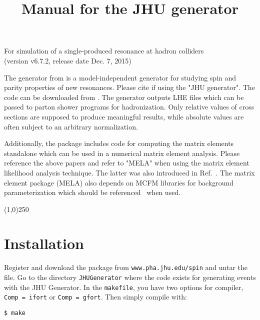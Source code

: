 \documentclass[aps,superscriptaddress,nofootinbib]{revtex4}
\begin{document}
\vspace{0.6cm}

\title{
\large
Manual for the JHU generator
}
\maketitle
\begin{center}
\small
For simulation of a single-produced resonance at hadron colliders \\
(version v6.7.2, release date Dec. 7, 2015) \\
\normalsize
\end{center}

\noindent
The generator from \cite{Gao:2010qx,Bolognesi:2012,Anderson:2013} is a model-independent generator for studying spin and parity properties of new resonances.
Please cite \cite{Gao:2010qx,Bolognesi:2012,Anderson:2013} if using the "JHU generator".
The code can be downloaded from \cite{thesite}.
The generator outputs LHE files which can be passed to parton shower programs for hadronization.
Only relative values of cross sections are supposed to produce meaningful results, while absolute values are often subject to an arbitrary normalization.

Additionally, the package includes code for computing the matrix elements standalone which can be used in a numerical matrix element analysis.
Please reference the above papers and refer to "MELA" when using the matrix element likelihood analysis technique.
The latter was also introduced in Ref.~\cite{Chatrchyan:2012ufa}. The matrix element package (MELA) also depends
on MCFM libraries for background parameterization which should be referenced~\cite{Campbell:2010ff} when used.

\vspace{0.5cm}
\begin{center}
\line(1,0){250}
\end{center}
\vspace{0.5cm}
\tableofcontents
\begin{center}
\end{center}
\vspace{0.5cm}


\section{ Installation }

\noindent
Register and download the package from \verb|www.pha.jhu.edu/spin| and untar the file.  Go to the directory \verb|JHUGenerator| where the code exists for generating events with the JHU Generator. In the \verb|makefile|, you have two options for compiler, \verb|Comp = ifort| or \verb|Comp = gfort|.  Then simply compile with:
\begin{verbatim}
$ make
\end{verbatim}
\end{document}

